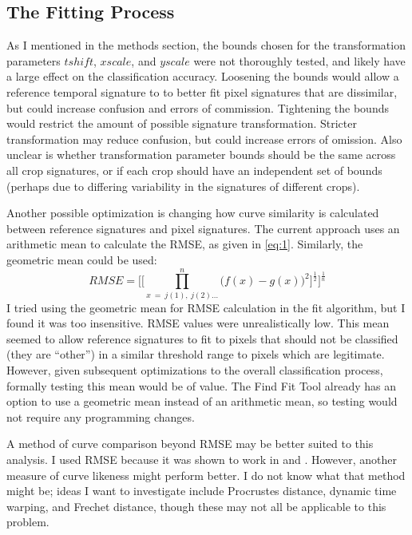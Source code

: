 \subsection{The Fitting Process}

As I mentioned in the methods section, the bounds chosen for the transformation parameters $tshift$, $xscale$, and $yscale$ were not thoroughly tested, and likely have a large effect on the classification accuracy. Loosening the bounds would allow a reference temporal signature to to better fit pixel signatures that are dissimilar, but could increase confusion and errors of commission. Tightening the bounds would restrict the amount of possible signature transformation. Stricter transformation may reduce confusion, but could increase errors of omission. Also unclear is whether transformation parameter bounds should be the same across all crop signatures, or if each crop should have an independent set of bounds (perhaps due to differing variability in the signatures of different crops).

Another possible optimization is changing how curve similarity is calculated between reference signatures and pixel signatures. The current approach uses an arithmetic mean to calculate the RMSE, as given in \autoref{eq:1}. Similarly, the geometric mean could be used:
\begin{equation}
\label{eq:geometricmean}
  RMSE = \Biggl[\biggl[\prod_{x\ =\ j(1),\ j(2)\ldots}^{n}\bigl(f\left(x\right)-g\left(x\right)\bigr)^{2}\biggr]^{\frac{1}{2}}\Biggr]^{\frac{1}{n}}
\end{equation}
I tried using the geometric mean for RMSE calculation in the fit algorithm, but I found it was too insensitive. RMSE values were unrealistically low. This mean seemed to allow reference signatures to fit to pixels that should not be classified (they are ``other'') in a similar threshold range to pixels which are legitimate. However, given subsequent optimizations to the overall classification process, formally testing this mean would be of value. The Find Fit Tool already has an option to use a geometric mean instead of an arithmetic mean, so testing would not require any programming changes.

A method of curve comparison beyond RMSE may be better suited to this analysis. I used RMSE because it was shown to work in \textcite{brown2007multitemporal} and \textcite{sakamoto2010a-two-step}. However, another measure of curve likeness might perform better. I do not know what that method might be; ideas I want to investigate include Procrustes distance, dynamic time warping, and Frechet distance, though these may not all be applicable to this problem.

